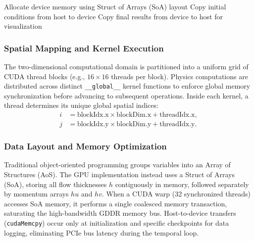 \documentclass[10pt, conference]{FMFP2023}
\begin{document}
\begin{algorithm}[t]
\caption{Parallel GPU Execution (Host-Side Coordination)}
\label{alg:gpu}
\SetAlgoLined
Allocate device memory using Struct of Arrays (SoA) layout\;
Copy initial conditions from host to device\;
Copy final results from device to host for visualization\;
\end{algorithm}

\subsubsection{Spatial Mapping and Kernel Execution}

The two-dimensional computational domain is partitioned into a uniform
grid of CUDA thread blocks (e.g., $16\times16$ threads per block).
Physics computations are distributed across distinct
\texttt{\_\_global\_\_} kernel functions to enforce global memory
synchronization before advancing to subsequent operations.
Inside each kernel, a thread determines its unique global spatial
indices:
\begin{align}
    i &= \text{blockIdx.x} \times \text{blockDim.x}
         + \text{threadIdx.x}, \\
    j &= \text{blockIdx.y} \times \text{blockDim.y}
         + \text{threadIdx.y}.
\end{align}

\subsubsection{Data Layout and Memory Optimization}

Traditional object-oriented programming groups variables into an
Array of Structures (AoS).
The GPU implementation instead uses a Struct of Arrays (SoA), storing
all flow thicknesses $h$ contiguously in memory, followed separately
by momentum arrays $hu$ and $hv$.
When a CUDA warp (32 synchronized threads) accesses SoA memory, it
performs a single coalesced memory transaction, saturating the
high-bandwidth GDDR memory bus.
Host-to-device transfers (\texttt{cudaMemcpy}) occur only at
initialization and specific checkpoints for data logging, eliminating
PCIe bus latency during the temporal loop.
\end{document}
